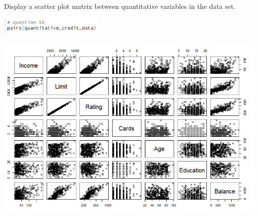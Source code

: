 Display a scatter plot matrix between quantitative variables in the data set.

\noindent \includegraphics[width=2in]{r_1b-1.PNG}

\noindent \includegraphics[width=6in]{r_1b-2.PNG}
